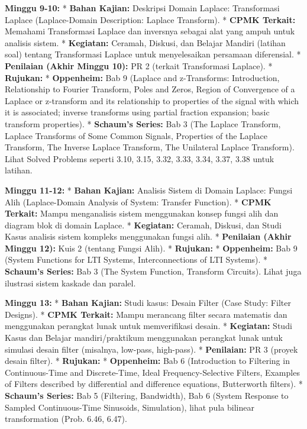 \documentclass[
  letterpaper,
  DIV=11,
  numbers=noendperiod]{scrreprt}
\begin{document}
\textbf{Minggu 9-10:} * \textbf{Bahan Kajian:} Deskripsi Domain Laplace:
Transformasi Laplace (Laplace-Domain Description: Laplace Transform). *
\textbf{CPMK Terkait:} Memahami Transformasi Laplace dan inversnya
sebagai alat yang ampuh untuk analisis sistem. * \textbf{Kegiatan:}
Ceramah, Diskusi, dan Belajar Mandiri (latihan soal) tentang
Transformasi Laplace untuk menyelesaikan persamaan diferensial. *
\textbf{Penilaian (Akhir Minggu 10):} PR 2 (terkait Transformasi
Laplace). * \textbf{Rujukan:} * \textbf{Oppenheim:} Bab 9 (Laplace and
z-Transforms: Introduction, Relationship to Fourier Transform, Poles and
Zeros, Region of Convergence of a Laplace or z-transform and its
relationship to properties of the signal with which it is associated;
inverse transforms using partial fraction expansion; basic transform
properties). * \textbf{Schaum's Series:} Bab 3 (The Laplace Transform,
Laplace Transforms of Some Common Signals, Properties of the Laplace
Transform, The Inverse Laplace Transform, The Unilateral Laplace
Transform). Lihat Solved Problems seperti 3.10, 3.15, 3.32, 3.33, 3.34,
3.37, 3.38 untuk latihan.

\textbf{Minggu 11-12:} * \textbf{Bahan Kajian:} Analisis Sistem di
Domain Laplace: Fungsi Alih (Laplace-Domain Analysis of System: Transfer
Function). * \textbf{CPMK Terkait:} Mampu menganalisis sistem
menggunakan konsep fungsi alih dan diagram blok di domain Laplace. *
\textbf{Kegiatan:} Ceramah, Diskusi, dan Studi Kasus analisis sistem
kompleks menggunakan fungsi alih. * \textbf{Penilaian (Akhir Minggu
12):} Kuis 2 (tentang Fungsi Alih). * \textbf{Rujukan:} *
\textbf{Oppenheim:} Bab 9 (System Functions for LTI Systems,
Interconnections of LTI Systems). * \textbf{Schaum's Series:} Bab 3 (The
System Function, Transform Circuits). Lihat juga ilustrasi sistem
kaskade dan paralel.

\textbf{Minggu 13:} * \textbf{Bahan Kajian:} Studi kasus: Desain Filter
(Case Study: Filter Designs). * \textbf{CPMK Terkait:} Mampu merancang
filter secara matematis dan menggunakan perangkat lunak untuk
memverifikasi desain. * \textbf{Kegiatan:} Studi Kasus dan Belajar
mandiri/praktikum menggunakan perangkat lunak untuk simulasi desain
filter (misalnya, low-pass, high-pass). * \textbf{Penilaian:} PR 3
(proyek desain filter). * \textbf{Rujukan:} * \textbf{Oppenheim:} Bab 6
(Introduction to Filtering in Continuous-Time and Discrete-Time, Ideal
Frequency-Selective Filters, Examples of Filters described by
differential and difference equations, Butterworth filters). *
\textbf{Schaum's Series:} Bab 5 (Filtering, Bandwidth), Bab 6 (System
Response to Sampled Continuous-Time Sinusoids, Simulation), lihat pula
bilinear transformation (Prob. 6.46, 6.47).
\end{document}
